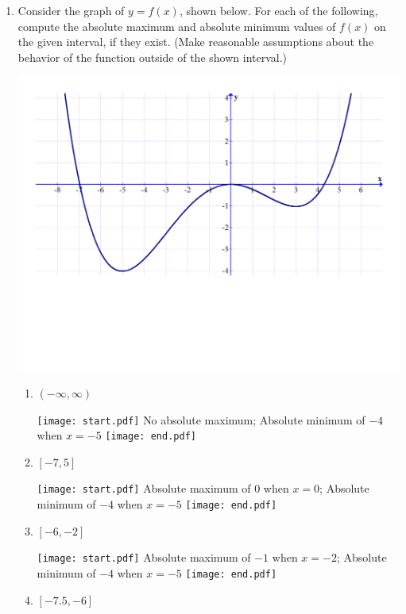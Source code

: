 \documentclass[12pt]{article}
\begin{document}
\begin{enumerate}

\item  Consider the graph of $y=f(x)$, shown below. For each of the following, compute the absolute maximum and absolute minimum values of $f(x)$ on the given interval, if they exist.  (Make reasonable assumptions about the behavior of the function outside of the shown interval.)

\begin{center}
\includegraphics[scale=0.5]{graph.pdf}
\end{center}

\begin{enumerate}

\item $(-\infty,\infty)$

\texttt{[image: start.pdf]}
{{No absolute maximum; Absolute minimum of $-4$ when $x=-5$}}
\texttt{[image: end.pdf]}


\item $[-7,5]$

\texttt{[image: start.pdf]}
{{Absolute maximum of 0 when $x=0$; Absolute minimum of $-4$ when $x=-5$}}
\texttt{[image: end.pdf]}


\item $[-6,-2]$

\texttt{[image: start.pdf]}
{{Absolute maximum of $-1$ when $x=-2$; Absolute minimum of $-4$ when $x=-5$}}
\texttt{[image: end.pdf]}


\item $[-7.5,-6]$


\end{enumerate}
\end{enumerate}
\end{document}
